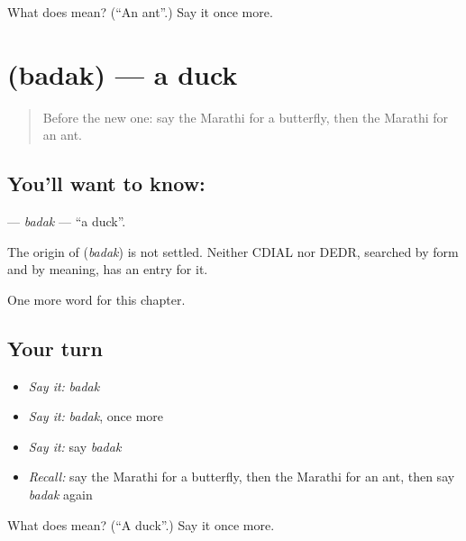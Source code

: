 \begin{tcolorbox}[breakable,colback=teal!4,colframe=teal!35!black,title={Before you move on}]
What does  mean? (\textquotedblleft{}An ant\textquotedblright{}.) Say it once more.
\end{tcolorbox}
\section[\texorpdfstring{\mr{बदक} (badak)}{बदक (badak)}]{ (badak) — a duck}

\label{lesson:MR-C103-badak}



\begin{quote}
Before the new one: say the Marathi for a butterfly, then the Marathi for an ant.
\end{quote}

\subsection*{You'll want to know: }
\textbf{} — \emph{badak} — \textquotedblleft{}a duck\textquotedblright{}.

\begin{cousinweb}
The origin of \textbf{} (\emph{badak}) is not settled. Neither CDIAL nor DEDR, searched by form and by meaning, has an entry for it.
\end{cousinweb}

\begin{grammarlens}[title={What you've built}]
One more word for this chapter.
\end{grammarlens}

\subsection*{Your turn}
\begin{itemize}
\raggedright
  \item \emph{Say it:} \emph{badak}
  \item \emph{Say it:} \emph{badak}, once more
  \item \emph{Say it:} say \emph{badak}
  \item \emph{Recall:} say the Marathi for a butterfly, then the Marathi for an ant, then say \emph{badak} again
\end{itemize}

\begin{tcolorbox}[breakable,colback=teal!4,colframe=teal!35!black,title={Before you move on}]
What does  mean? (\textquotedblleft{}A duck\textquotedblright{}.) Say it once more.
\end{tcolorbox}
